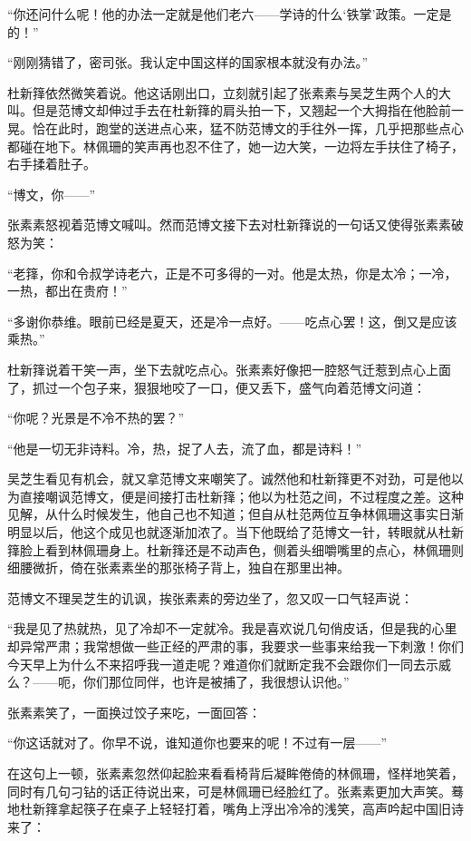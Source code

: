 \par “你还问什么呢！他的办法一定就是他们老六——学诗的什么‘铁掌’政策。一定是的！”
\par “刚刚猜错了，密司张。我认定中国这样的国家根本就没有办法。”
\par 杜新箨依然微笑着说。他这话刚出口，立刻就引起了张素素与吴芝生两个人的大叫。但是范博文却伸过手去在杜新箨的肩头拍一下，又翘起一个大拇指在他脸前一晃。恰在此时，跑堂的送进点心来，猛不防范博文的手往外一挥，几乎把那些点心都碰在地下。林佩珊的笑声再也忍不住了，她一边大笑，一边将左手扶住了椅子，右手揉着肚子。
\par “博文，你——”
\par 张素素怒视着范博文喊叫。然而范博文接下去对杜新箨说的一句话又使得张素素破怒为笑：
\par “老箨，你和令叔学诗老六，正是不可多得的一对。他是太热，你是太冷；一冷，一热，都出在贵府！”
\par “多谢你恭维。眼前已经是夏天，还是冷一点好。——吃点心罢！这，倒又是应该乘热。”
\par 杜新箨说着干笑一声，坐下去就吃点心。张素素好像把一腔怒气迁惹到点心上面了，抓过一个包子来，狠狠地咬了一口，便又丢下，盛气向着范博文问道：
\par “你呢？光景是不冷不热的罢？”
\par “他是一切无非诗料。冷，热，捉了人去，流了血，都是诗料！”
\par 吴芝生看见有机会，就又拿范博文来嘲笑了。诚然他和杜新箨更不对劲，可是他以为直接嘲讽范博文，便是间接打击杜新箨；他以为杜范之间，不过程度之差。这种见解，从什么时候发生，他自己也不知道；但自从杜范两位互争林佩珊这事实日渐明显以后，他这个成见也就逐渐加浓了。当下他既给了范博文一针，转眼就从杜新箨脸上看到林佩珊身上。杜新箨还是不动声色，侧着头细嚼嘴里的点心，林佩珊则细腰微折，倚在张素素坐的那张椅子背上，独自在那里出神。
\par 范博文不理吴芝生的讥讽，挨张素素的旁边坐了，忽又叹一口气轻声说：
\par “我是见了热就热，见了冷却不一定就冷。我是喜欢说几句俏皮话，但是我的心里却异常严肃；我常想做一些正经的严肃的事，我要求一些事来给我一下刺激！你们今天早上为什么不来招呼我一道走呢？难道你们就断定我不会跟你们一同去示威么？——呃，你们那位同伴，也许是被捕了，我很想认识他。”
\par 张素素笑了，一面换过饺子来吃，一面回答：
\par “你这话就对了。你早不说，谁知道你也要来的呢！不过有一层——”
\par 在这句上一顿，张素素忽然仰起脸来看看椅背后凝眸倦倚的林佩珊，怪样地笑着，同时有几句刁钻的话正待说出来，可是林佩珊已经脸红了。张素素更加大声笑。蓦地杜新箨拿起筷子在桌子上轻轻打着，嘴角上浮出冷冷的浅笑，高声吟起中国旧诗来了：
